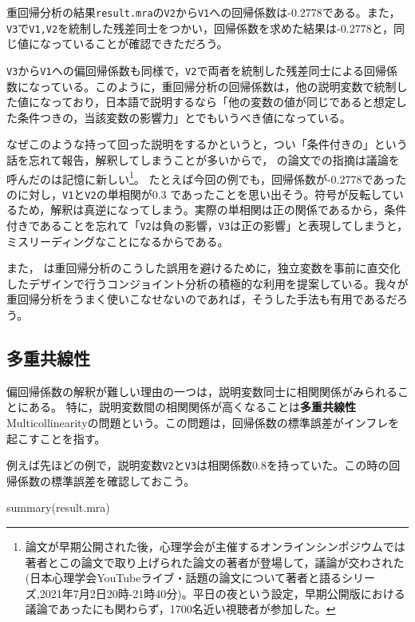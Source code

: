 \documentclass[
  a4paper,
]{ltjsbook}
\newenvironment{Shaded}{\begin{snugshade}}{\end{snugshade}}
\newcommand{\FunctionTok}[1]{\textcolor[rgb]{0.28,0.35,0.67}{#1}}
\newcommand{\NormalTok}[1]{\textcolor[rgb]{0.00,0.23,0.31}{#1}}
\begin{document}
重回帰分析の結果\texttt{result.mra}の\texttt{V2}から\texttt{V1}への回帰係数は-0.2778である。また，\texttt{V3}で\texttt{V1,V2}を統制した残差同士をつかい，回帰係数を求めた結果は-0.2778と，同じ値になっていることが確認できただろう。

\texttt{V3}から\texttt{V1}への偏回帰係数も同様で，\texttt{V2}で両者を統制した残差同士による回帰係数になっている。このように，重回帰分析の回帰係数は，他の説明変数で統制した値になっており，日本語で説明するなら「他の変数の値が同じであると想定した条件つきの，当該変数の影響力」とでもいうべき値になっている。

なぜこのような持って回った説明をするかというと，つい「条件付きの」という話を忘れて報告，解釈してしまうことが多いからで，\textcite{yoshidaMRA}
の論文での指摘は議論を呼んだのは記憶に新しい\footnote{論文が早期公開された後，心理学会が主催するオンラインシンポジウムでは著者とこの論文で取り上げられた論文の著者が登場して，議論が交わされた(日本心理学会YouTubeライブ・話題の論文について著者と語るシリーズ,2021年7月2日20時-21時40分)。平日の夜という設定，早期公開版における議論であったにも関わらず，1700名近い視聴者が参加した。}。
たとえば今回の例でも，回帰係数が-0.2778であったのに対し，\texttt{V1}と\texttt{V2}の単相関が0.3
であったことを思い出そう。符号が反転しているため，解釈は真逆になってしまう。実際の単相関は正の関係であるから，条件付きであることを忘れて「\texttt{V2}は負の影響，\texttt{V3}は正の影響」と表現してしまうと，ミスリーディングなことになるからである。

また，\textcite{Toyoda201706}
は重回帰分析のこうした誤用を避けるために，独立変数を事前に直交化したデザインで行うコンジョイント分析の積極的な利用を提案している。我々が重回帰分析をうまく使いこなせないのであれば，そうした手法も有用であるだろう。

\subsection{多重共線性}\label{ux591aux91cdux5171ux7ddaux6027}

偏回帰係数の解釈が難しい理由の一つは，説明変数同士に相関関係がみられることにある。
特に，説明変数間の相関関係が高くなることは\textbf{多重共線性}Multicollinearityの問題という。この問題は，回帰係数の標準誤差がインフレを起こすことを指す。

例えば先ほどの例で，説明変数\texttt{V2}と\texttt{V3}は相関係数\(0.8\)を持っていた。この時の回帰係数の標準誤差を確認しておこう。

\begin{Shaded}
\begin{Highlighting}[]
\FunctionTok{summary}\NormalTok{(result.mra)}
\end{Highlighting}
\end{Shaded}
\end{document}
